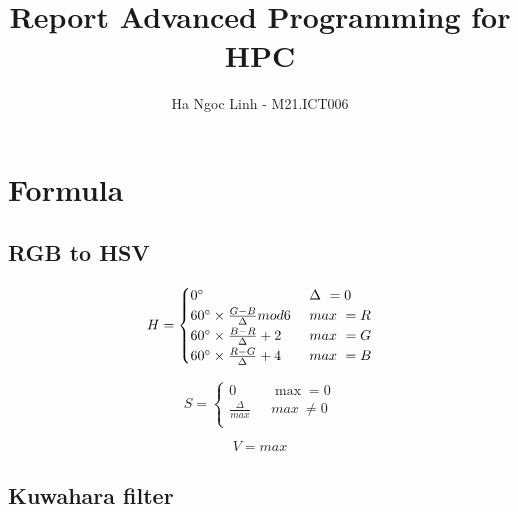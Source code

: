 \documentclass{article}
\title{Report Advanced Programming for HPC}
\author{Ha Ngoc Linh - M21.ICT006}
\begin{document}
\maketitle

\section{Formula}
\subsection{RGB to HSV}
\begin{equation}
H = \begin{cases}
0 \degree &\text{ $\Delta\ =  0$}\\
60 \degree \times \frac{G - B}{\Delta}mod 6 &\text{ $max\ =  R$}\\
60 \degree \times \frac{B - R}{\Delta} + 2 &\text{ $max\ =  G$}\\
60 \degree \times \frac{R - G}{\Delta} + 4 &\text{ $max\ =  B$}\\
\end{cases}
\end{equation}

\begin{equation}
S = \begin{cases}
0  &\text{ $\max =  0$}\\
\frac{\Delta}{max} &\text{ $max\ \neq  0$}\\
\end{cases}
\end{equation}

\begin{equation}
V = max
\end{equation}

\subsection{Kuwahara filter}
\end{document}
